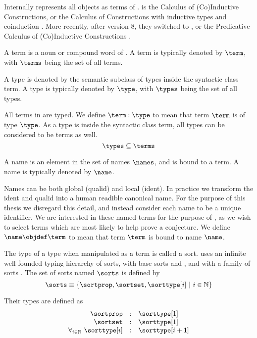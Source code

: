 Internally \coq represents all objects as terms  of \cic{}.
\cic is the Calculus of (Co)Inductive Constructions,
or the Calculus of Constructions \cite{coquand1988calculus} with inductive types and coinduction \cite{huet1987induction} \cite{coquand1990inductively}.
More recently, after \coq version 8, they switched to \pcic {}, or the Predicative Calculus of (Co)Inductive Constructions \cite{bertot2013interactive}.

\begin{definition}[term]
	A term is a noun or compound word of \pcic.
	A term is typically denoted by $\term$,
	with $\terms$ being the set of all terms.
\end{definition}

\begin{definition}[type]\label{def:type}
	A type is denoted by the semantic subclass of types inside the syntactic class term.
	A type is typically denoted by $\type$, with $\types$ being the set of all types.
\end{definition}

All terms in \coq are typed.
We define $\term : \type$ to mean that term $\term$ is of type $\type$.
As a type is inside the syntactic class term, all types can be considered to be terms as well.
\[ \types \subseteq \terms \]

\begin{definition}[name]
	A name is an element in the set of names $\names$, and is bound to a term. A name is typically denoted by $\name$.
\end{definition}
Names can be both global (qualid) and local (ident).
In practice we transform the ident and qualid into a human readible canonical name.
For the purpose of this thesis we disregard this detail, and instead consider each name to be a unique identifier.
We are interested in these named terms for the purpose of \premiseselection,
as we wish to select terms which are most likely to help prove a conjecture.
We define $\name \objdef \term$ to mean that term $\term$ is bound to name $\name$.

\begin{definition}[sort]\label{def:sort}
	The type of a type when manipulated as a term is called a sort.
	\pcic uses an infinite well-founded typing hierarchy of sorts,
	with base sorts \sortprop{} and \sortset{},
	and with a family of sorts \sorttype[{i}].
	The set of sorts named $\sorts$ is defined by
	\[\sorts \equiv \{ \sortprop, \sortset, \sorttype[{i}] ~|~ i \in \mathbb{N} \} \]

	Their types are defined as
	\[
		\begin{array}{rcl}
			\sortprop & : & \sorttype[1] \\
			\sortset & : & \sorttype[1] \\
			\forall_{i \in \mathbb{N}}~ \sorttype[i] & : & \sorttype[{i+1}]
		\end{array}
	\]
\end{definition}

